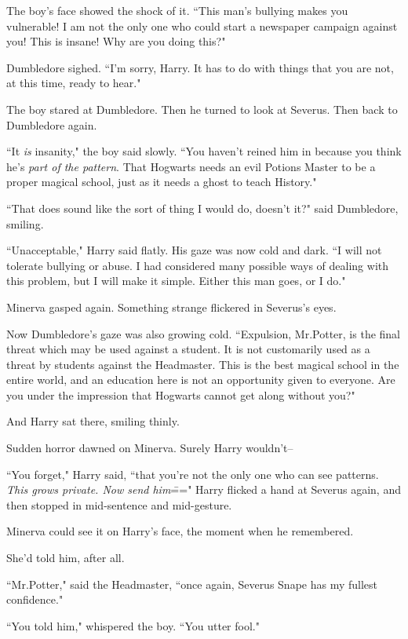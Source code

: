 The boy's face showed the shock of it. ``This man's bullying makes you vulnerable! I am not the only one who could start a newspaper campaign against you! This is insane! Why are you doing this?"

Dumbledore sighed. ``I'm sorry, Harry. It has to do with things that you are not, at this time, ready to hear."

The boy stared at Dumbledore. Then he turned to look at Severus. Then back to Dumbledore again.

``It \emph{is} insanity," the boy said slowly. ``You haven't reined him in because you think he's \emph{part of the pattern}. That Hogwarts needs an evil Potions Master to be a proper magical school, just as it needs a ghost to teach History."

``That does sound like the sort of thing I would do, doesn't it?" said Dumbledore, smiling.

``Unacceptable," Harry said flatly. His gaze was now cold and dark. ``I will not tolerate bullying or abuse. I had considered many possible ways of dealing with this problem, but I will make it simple. Either this man goes, or I do."

Minerva gasped again. Something strange flickered in Severus's eyes.

Now Dumbledore's gaze was also growing cold. ``Expulsion, Mr.\?Potter, is the final threat which may be used against a student. It is not customarily used as a threat by students against the Headmaster. This is the best magical school in the entire world, and an education here is not an opportunity given to everyone. Are you under the impression that Hogwarts cannot get along without you?"

And Harry sat there, smiling thinly.

Sudden horror dawned on Minerva. Surely Harry wouldn't\---

``You forget," Harry said, ``that you're not the only one who can see patterns. \emph{This grows private. Now send him}\===" Harry flicked a hand at Severus again, and then stopped in mid-sentence and mid-gesture.

Minerva could see it on Harry's face, the moment when he remembered.

She'd told him, after all.

``Mr.\?Potter," said the Headmaster, ``once again, Severus Snape has my fullest confidence."

``You told him," whispered the boy. ``You utter fool."

